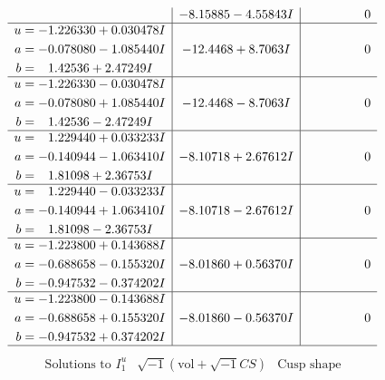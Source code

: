 \documentclass[1p]{elsarticle_modified}
\theoremstyle{definition}
\newcommand{\I}{\sqrt{-1}}
\begin{document}
$$\begin{array}{c|c|c}
 & -8.15885 - 4.55843 I & \phantom{-0.000000 } 0 \\ \hline\begin{aligned}
u &= -1.226330 + 0.030478 I \\
a &= -0.078080 - 1.085440 I \\
b &= \phantom{-}1.42536 + 2.47249 I\end{aligned}
 & -12.4468 + 8.7063 I & \phantom{-0.000000 } 0 \\ \hline\begin{aligned}
u &= -1.226330 - 0.030478 I \\
a &= -0.078080 + 1.085440 I \\
b &= \phantom{-}1.42536 - 2.47249 I\end{aligned}
 & -12.4468 - 8.7063 I & \phantom{-0.000000 } 0 \\ \hline\begin{aligned}
u &= \phantom{-}1.229440 + 0.033233 I \\
a &= -0.140944 - 1.063410 I \\
b &= \phantom{-}1.81098 + 2.36753 I\end{aligned}
 & -8.10718 + 2.67612 I & \phantom{-0.000000 } 0 \\ \hline\begin{aligned}
u &= \phantom{-}1.229440 - 0.033233 I \\
a &= -0.140944 + 1.063410 I \\
b &= \phantom{-}1.81098 - 2.36753 I\end{aligned}
 & -8.10718 - 2.67612 I & \phantom{-0.000000 } 0 \\ \hline\begin{aligned}
u &= -1.223800 + 0.143688 I \\
a &= -0.688658 - 0.155320 I \\
b &= -0.947532 - 0.374202 I\end{aligned}
 & -8.01860 + 0.56370 I & \phantom{-0.000000 } 0 \\ \hline\begin{aligned}
u &= -1.223800 - 0.143688 I \\
a &= -0.688658 + 0.155320 I \\
b &= -0.947532 + 0.374202 I\end{aligned}
 & -8.01860 - 0.56370 I & \phantom{-0.000000 } 0\\
 \hline 
 \end{array}$$\newpage$$\begin{array}{c|c|c}  
\text{Solutions to }I^u_{1}& \I (\text{vol} + \sqrt{-1}CS) & \text{Cusp shape}\\

\end{array}$$
\end{document}
